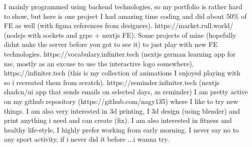 \documentclass{my_cv}
\begin{document}
			\begin{adjustwidth}{2em}{0em}
    I mainly programmed using backend technologies, so my portfolio is rather hard to show, but here is one project 
    I had amazing time coding and did about 50\% of FE as well (with figma references from designers). 
    https://market.rull.world/ (nodejs with sockets and grpc + nextjs FE).
   Some projects of mine (hopefully didnt nuke the server before you got to see it) to just play with new FE technologies.
   https://vocabulary.infiniter.tech (nextjs german learning app for me, mostly as an excuse to use the interactive logo somewhere).
   https://infiniter.tech (this is my collection of animations I enjoyed playing with so i recreated them from scratch).
   https://reminder.infiniter.tech (nextjs shadcn/ui app that sends emails on selected days, as reminder) I am pretty active on my github repository (https://github.com/nagy135) where I like to try new things. 
   I am also very interested in 3d printing, I 3d design (using blender) and print anything i need and can create (fix).
   I am also interested in fitness and healthy life-style, I highly prefer working from early morning. I never say no to any sport activity, if i never did it before ...i wanna try.
			\end{adjustwidth}


		
\end{document}
